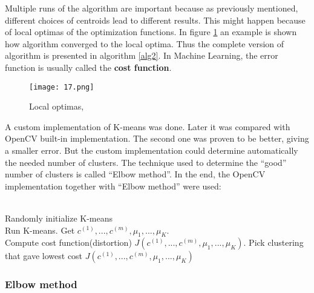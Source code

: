         Multiple runs of the algorithm are important because as previously mentioned, different choices of centroids lead to different results. This might happen because of local optimas of the optimization functions. In figure \ref{localOptimas} an example is shown how algorithm converged to the local optima. Thus the complete version of algorithm is presented in algorithm \ref{alg2}. In Machine Learning, the error function is usually called the \textbf{cost function}.
                \begin{figure}[h!]
          \centering
          \texttt{[image: 17.png]} 
          \caption{Local optimas, \cite{slides}}
          \label{localOptimas}
        \end{figure}

      A custom implementation of K-means was done. Later it was compared with OpenCV built-in implementation. The second one was proven to be better, giving a smaller error. But the custom implementation could determine automatically the needed number of clusters. The technique used to determine the ``good'' number of clusters is called ``Elbow method''. In the end, the OpenCV implementation together with ``Elbow method'' were used:

        \begin{algorithm}
          \begin{algorithmic}
             {\\}
              {Randomly initialize K-means \\}
              {Run K-means. Get \( c^{(1)}, ..., c^{(m)}, \mu_1, ..., \mu_K \).  \\}
              {Compute cost function(distortion) \( J(c^{(1)}, ..., c^{(m)}, \mu_1, ..., \mu_K) \).}
            \EndFor
            {Pick clustering that gave lowest cost \( J(c^{(1)}, ..., c^{(m)}, \mu_1, ..., \mu_K) \)}
        \end{algorithmic}
        \caption{K-Means algorithm with multiple runs}\label{alg2}
      \end{algorithm}



    \subsubsection{Elbow method}

